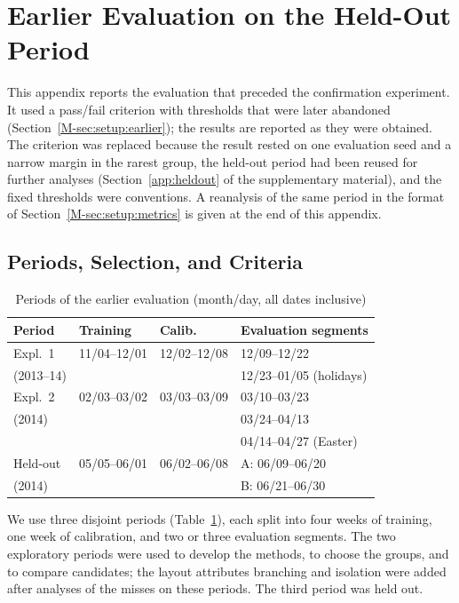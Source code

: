 \section{Earlier Evaluation on the Held-Out Period}
\label{app:earlier}

This appendix reports the evaluation that preceded the confirmation experiment.
It used a pass/fail criterion with thresholds that were later abandoned
(Section~\ref{M-sec:setup:earlier}); the results are reported as they were obtained.
The criterion was replaced because the result rested on one evaluation seed and a
narrow margin in the rarest group, the held-out period had been reused for
further analyses (Section~\ref{app:heldout} of the supplementary material), and
the fixed thresholds were conventions.
A reanalysis of the same period in the format of Section~\ref{M-sec:setup:metrics}
is given at the end of this appendix.

\subsection{Periods, Selection, and Criteria}
\label{app:earlier:protocol}

\begin{table}[!htbp]
\centering
\caption{Periods of the earlier evaluation (month/day, all dates inclusive)}
\footnotesize
\label{tab:earlier_periods}
\begin{tabular}{@{}llll@{}}
\toprule
Period & Training & Calib. & Evaluation segments \\
\midrule
Expl.~1 & 11/04--12/01 & 12/02--12/08 & 12/09--12/22 \\
(2013--14) & & & 12/23--01/05 (holidays) \\
Expl.~2 & 02/03--03/02 & 03/03--03/09 & 03/10--03/23 \\
(2014) & & & 03/24--04/13 \\
 & & & 04/14--04/27 (Easter) \\
Held-out & 05/05--06/01 & 06/02--06/08 & A: 06/09--06/20 \\
(2014) & & & B: 06/21--06/30 \\
\bottomrule
\end{tabular}
\end{table}

We use three disjoint periods (Table~\ref{tab:earlier_periods}), each split into four weeks
of training, one week of calibration, and two or three evaluation segments. The two
exploratory periods were used to develop the methods, to choose the groups, and to
compare candidates; the layout attributes branching and isolation were added after
analyses of the misses on these periods. The third period was held out.

